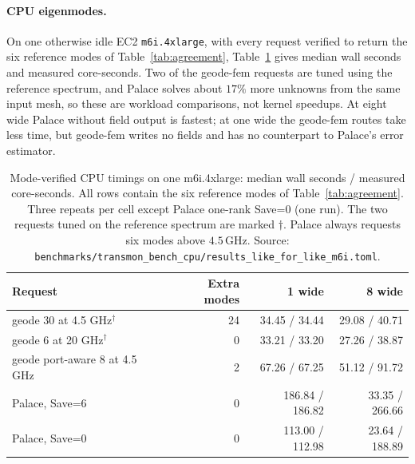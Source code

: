 \documentclass{anvil-paper}
\begin{document}
\paragraph{CPU eigenmodes.}
On one otherwise idle EC2 \texttt{m6i.4xlarge}, with every request
verified to return the six reference modes of Table~\ref{tab:agreement},
Table~\ref{tab:cpu} gives median wall seconds and measured core-seconds.
Two of the geode-fem requests are tuned using the reference spectrum, and
Palace solves about $17\%$ more unknowns from the same input mesh, so
these are workload comparisons, not kernel speedups. At eight wide Palace
without field output is fastest; at one wide the geode-fem routes take
less time, but geode-fem writes no fields and has no counterpart to
Palace's error estimator.

\begin{table}[tbp]
  \centering
  \caption{Mode-verified CPU timings on one m6i.4xlarge: median wall
  seconds / measured core-seconds. All rows contain the six reference
  modes of Table~\ref{tab:agreement}. Three repeats per cell except Palace
  one-rank Save=0 (one run). The two requests tuned on the reference
  spectrum are marked $\dagger$. Palace always requests six modes above
  $4.5$\,GHz. Source:
  \texttt{benchmarks/transmon\_bench\_cpu/results\_like\_for\_like\_m6i.toml}.}
  \label{tab:cpu}
  \small
  \begin{tabular}{@{}lrrr@{}}
    \toprule
    Request & Extra modes & 1 wide & 8 wide \\
    \midrule
    geode 30 at 4.5 GHz$^\dagger$ & 24 & 34.45 / 34.44 & 29.08 / 40.71 \\
    geode 6 at 20 GHz$^\dagger$ & 0 & 33.21 / 33.20 & 27.26 / 38.87 \\
    geode port-aware 8 at 4.5 GHz & 2 & 67.26 / 67.25 & 51.12 / 91.72 \\
    Palace, Save=6 & 0 & 186.84 / 186.82 & 33.35 / 266.66 \\
    Palace, Save=0 & 0 & 113.00 / 112.98 & 23.64 / 188.89 \\
    \bottomrule
  \end{tabular}
\end{table}
\end{document}

